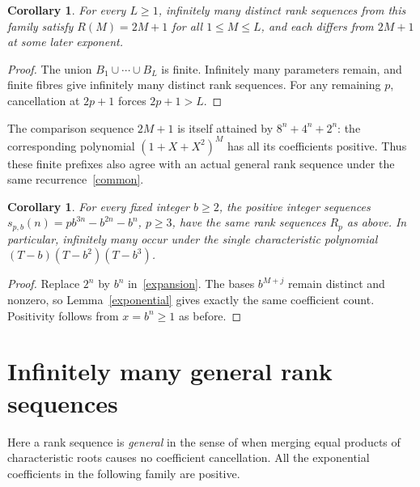 \documentclass[11pt]{article}
\newtheorem{corollary}[theorem]{Corollary}
\begin{document}
\begin{corollary}\label{prefix}
For every $L\geq1$, infinitely many distinct rank sequences from this
family satisfy $R(M)=2M+1$ for all $1\leq M\leq L$, and each differs
from $2M+1$ at some later exponent.
\end{corollary}
\begin{proof}
The union $B_1\cup\cdots\cup B_L$ is finite. Infinitely many parameters
remain, and finite fibres give infinitely many distinct rank sequences.
For any remaining $p$, cancellation at $2p+1$ forces $2p+1>L$.
\end{proof}
The comparison sequence $2M+1$ is itself attained by $8^n+4^n+2^n$:
the corresponding polynomial $(1+X+X^2)^M$ has all its coefficients
positive. Thus these finite prefixes also agree with an actual general
rank sequence under the same recurrence~\eqref{common}.

\begin{corollary}\label{base}
For every fixed integer $b\geq2$, the positive integer sequences
$s_{p,b}(n)=pb^{3n}-b^{2n}-b^n$, $p\geq3$, have the same rank
sequences $R_p$ as above. In particular, infinitely many occur under
the single characteristic polynomial $(T-b)(T-b^2)(T-b^3)$.
\end{corollary}
\begin{proof}
Replace $2^n$ by $b^n$ in~\eqref{expansion}. The bases $b^{M+j}$ remain
distinct and nonzero, so Lemma~\ref{exponential} gives exactly the same
coefficient count. Positivity follows from $x=b^n\geq1$ as before.
\end{proof}

\section{Infinitely many general rank sequences}
Here a rank sequence is \emph{general} in the sense of
\cite[Section~5, p.~13]{RSB} when merging equal products of characteristic
roots causes no coefficient cancellation. All the exponential coefficients
in the following family are positive.
\end{document}
